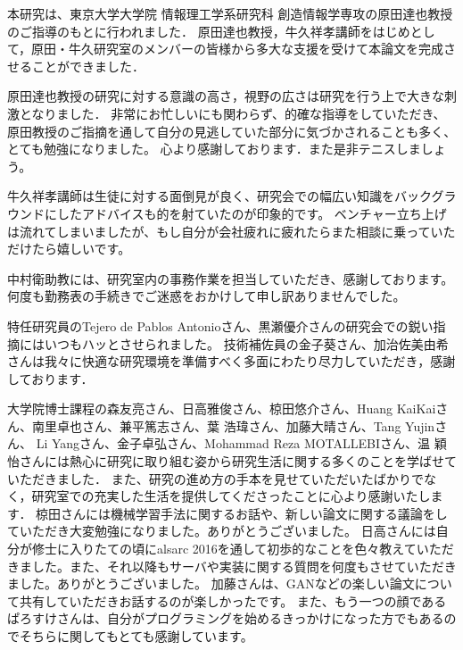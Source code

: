 
本研究は、東京大学大学院 情報理工学系研究科 創造情報学専攻の原田達也教授のご指導のもとに行われました．
原田達也教授，牛久祥孝講師をはじめとして，原田・牛久研究室のメンバーの皆様から多大な支援を受けて本論文を完成させることができました．

原田達也教授の研究に対する意識の高さ，視野の広さは研究を行う上で大きな刺激となりました．
非常にお忙しいにも関わらず、的確な指導をしていただき、原田教授のご指摘を通して自分の見逃していた部分に気づかされることも多く、とても勉強になりました。
心より感謝しております．また是非テニスしましょう。

牛久祥孝講師は生徒に対する面倒見が良く、研究会での幅広い知識をバックグラウンドにしたアドバイスも的を射ていたのが印象的です。
ベンチャー立ち上げは流れてしまいましたが、もし自分が会社疲れに疲れたらまた相談に乗っていただけたら嬉しいです。

中村衛助教には、研究室内の事務作業を担当していただき、感謝しております。
何度も勤務表の手続きでご迷惑をおかけして申し訳ありませんでした。

特任研究員のTejero de Pablos Antonioさん、黒瀬優介さんの研究会での鋭い指摘にはいつもハッとさせられました。
技術補佐員の金子葵さん、加治佐美由希さんは我々に快適な研究環境を準備すべく多面にわたり尽力していただき，感謝しております．


大学院博士課程の森友亮さん、日高雅俊さん、椋田悠介さん、Huang KaiKaiさん、南里卓也さん、兼平篤志さん、葉 浩瑋さん、加藤大晴さん、Tang Yujinさん、
Li Yangさん、金子卓弘さん、Mohammad Reza MOTALLEBIさん、温 穎怡さんには熱心に研究に取り組む姿から研究生活に関する多くのことを学ばせていただきました．
また、研究の進め方の手本を見せていただいたばかりでなく，研究室での充実した生活を提供してくださったことに心より感謝いたします．
椋田さんには機械学習手法に関するお話や、新しい論文に関する議論をしていただき大変勉強になりました。ありがとうございました。
日高さんには自分が修士に入りたての頃にalsarc 2016を通して初歩的なことを色々教えていただきました。また、それ以降もサーバや実装に関する質問を何度もさせていただきました。ありがとうございました。
加藤さんは、GANなどの楽しい論文について共有していただきお話するのが楽しかったです。
また、もう一つの顔であるぱろすけさんは、自分がプログラミングを始めるきっかけになった方でもあるのでそちらに関してもとても感謝しています。

